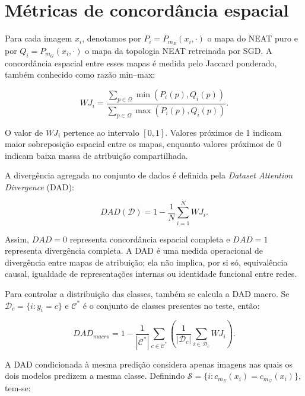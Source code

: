 \section{M\'etricas de concord\^ancia espacial}

Para cada imagem $x_i$, denotamos por
$P_i=P_{m_E}(x_i,\cdot)$ o mapa do NEAT puro e por
$Q_i=P_{m_G}(x_i,\cdot)$ o mapa da topologia NEAT retreinada por SGD. A
concord\^ancia espacial entre esses mapas \'{e} medida pelo Jaccard ponderado,
tamb\'em conhecido como raz\~ao min--max:

\begin{equation}
WJ_i =
\frac{\sum_{p\in\Omega} \min(P_i(p), Q_i(p))}
{\sum_{p\in\Omega} \max(P_i(p), Q_i(p))}.
\label{eq:weighted_jaccard}
\end{equation}

O valor de $WJ_i$ pertence ao intervalo $[0,1]$. Valores pr\'oximos de 1 indicam
maior sobreposi\c{c}\~ao espacial entre os mapas, enquanto valores pr\'oximos de 0
indicam baixa massa de atribui\c{c}\~ao compartilhada.

A diverg\^encia agregada no conjunto de dados \'{e} definida pela
\textit{Dataset Attention Divergence} (DAD):

\begin{equation}
DAD(\mathcal{D}) = 1 - \frac{1}{N}\sum_{i=1}^{N} WJ_i.
\label{eq:dad}
\end{equation}

Assim, $DAD=0$ representa concord\^ancia espacial completa e $DAD=1$ representa
diverg\^encia completa. A DAD \'{e} uma medida operacional de diverg\^encia entre
mapas de atribui\c{c}\~ao; ela n\~ao implica, por si s\'o, equival\^encia causal,
igualdade de representa\c{c}\~oes internas ou identidade funcional entre redes.

Para controlar a distribui\c{c}\~ao das classes, tamb\'em se calcula a DAD macro.
Se $\mathcal{D}_c=\{i:y_i=c\}$ e $\mathcal{C}^{\ast}$ \'{e} o conjunto de classes
presentes no teste, ent\~ao:

\begin{equation}
DAD_{macro}
= 1 - \frac{1}{|\mathcal{C}^{\ast}|}
\sum_{c\in\mathcal{C}^{\ast}}
\left(
\frac{1}{|\mathcal{D}_c|}
\sum_{i\in\mathcal{D}_c} WJ_i
\right).
\label{eq:dad_macro}
\end{equation}

A DAD condicionada \`a mesma predi\c{c}\~ao considera apenas imagens nas quais os
dois modelos predizem a mesma classe. Definindo
$\mathcal{S}=\{i:c_{m_E}(x_i)=c_{m_G}(x_i)\}$, tem-se:

